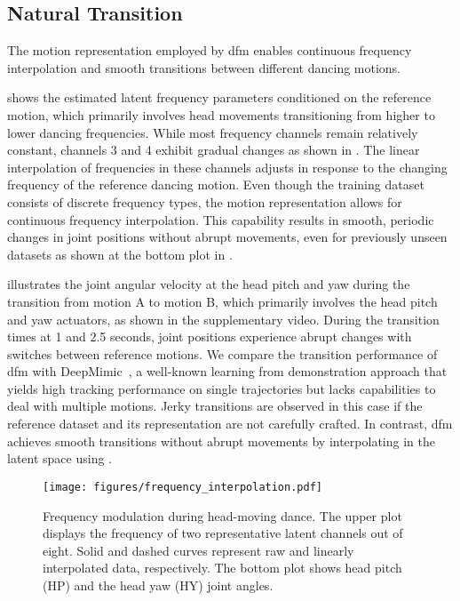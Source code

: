\subsection{Natural Transition}
The motion representation employed by \ac{dfm} enables continuous frequency interpolation and smooth transitions between different dancing motions.

 shows the estimated latent frequency parameters conditioned on the reference motion, which primarily involves head movements transitioning from higher to lower dancing frequencies.
While most frequency channels remain relatively constant, channels 3 and 4 exhibit gradual changes as shown in .
The linear interpolation of frequencies in these channels adjusts in response to the changing frequency of the reference dancing motion.
Even though the training dataset consists of discrete frequency types, the motion representation allows for continuous frequency interpolation.
This capability results in smooth, periodic changes in joint positions without abrupt movements, even for previously unseen datasets as shown at the bottom plot in .

 illustrates the joint angular velocity at the head pitch and yaw during the transition from motion A to motion B, which primarily involves the head pitch and yaw actuators, as shown in the supplementary video.
During the transition times at 1 and 2.5 seconds, joint positions experience abrupt changes with switches between reference motions.
We compare the transition performance of \ac{dfm} with DeepMimic~\cite{deepmimic}, a well-known learning from demonstration approach that yields high tracking performance on single trajectories but lacks capabilities to deal with multiple motions.
Jerky transitions are observed in this case if the reference dataset and its representation are not carefully crafted.
In contrast, \ac{dfm} achieves smooth transitions without abrupt movements by interpolating in the latent space using .

\begin{figure}[!t]
    \centering
    \texttt{[image: figures/frequency\_interpolation.pdf]}
    \caption{Frequency modulation during head-moving dance. The upper plot displays the frequency of two representative latent channels out of eight. Solid and dashed curves represent raw and linearly interpolated data, respectively. The bottom plot shows head pitch (HP) and the head yaw (HY) joint angles.}
    \label{fig:frequency_interpolation}
    \vspace{-1ex}
\end{figure}


